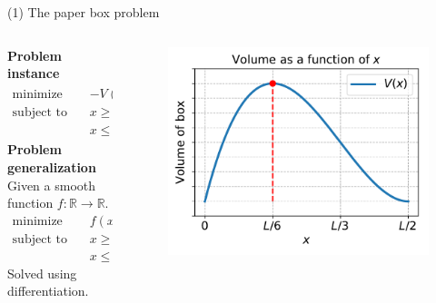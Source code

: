 \documentclass[11pt, aspectratio=149]{beamer}
\theoremstyle{plain}
\begin{document}
\begin{frame}[fragile, t]{(1) The paper box problem}
\begin{columns}
\begin{column}{0.55\textwidth}
\textbf{Problem instance}
\begin{align*}
\text{minimize } \quad & -V(x) = -(L - 2x)^2 x  \\
\text{subject to } \quad & x \geq 0 \\
& x \leq L/2
\end{align*}
\textbf{Problem generalization}
\\
\vspace*{0.5em} 
Given a smooth function $f: \mathbb{R} \to \mathbb{R}$.
\begin{align*}
	\text{minimize } \quad & f(x) \\
	\text{subject to } \quad & x \geq a \\
	 & x \leq b
\end{align*}
Solved using differentiation.
\end{column}
\begin{column}{0.45\textwidth}%
	\begin{figure}
		\centering
		\includegraphics[width=1.05\linewidth]{figs/paper_box_volume.pdf}
	\end{figure}
\end{column}
\end{columns}
\end{frame}

\end{document}
